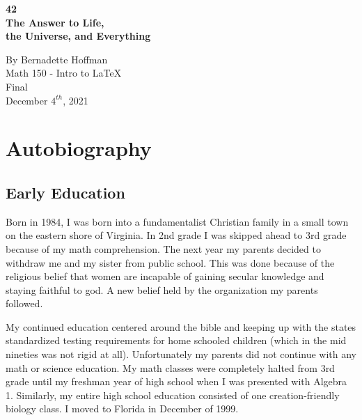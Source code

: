 \documentclass[oneside]{book}
\begin{document}
\frontmatter %
\begin{titlepage}
\begin{center}
\vspace*{3in}
\textbf{\Huge \color{purple}42\\ \huge The Answer to Life, \\the Universe, and Everything}

\bigskip

\LARGE{\color{black}By Bernadette Hoffman}
\bigskip
\bigskip
\large \\Math 150 - Intro to \LaTeX \\ Final \\ December $4^{th}$, 2021
\end{center}
\end{titlepage}

\tableofcontents
\thispagestyle{empty}
\cleardoublepage

\mainmatter %
\setcounter{page}{1}
\chapter{Autobiography}\label{sec:bio}
\section{Early Education}

Born in 1984, I was born into a fundamentalist Christian family in a small town on the eastern shore of Virginia. In 2nd grade I was skipped ahead to 3rd grade because of my math comprehension. The next year my parents decided to withdraw me and my sister from public school. This was done because of the religious belief that women are incapable of gaining secular knowledge and staying faithful to god. A new belief held by the organization my parents followed. 

My continued education centered around the bible and keeping up with the states standardized testing requirements for home schooled children (which in the mid nineties was not rigid at all). Unfortunately my parents did not continue with any math or science education. My math classes were completely halted from 3rd grade until my freshman year of high school when I was presented with Algebra 1. Similarly, my entire high school education consisted of one creation-friendly biology class. I moved to Florida in December of 1999.
\end{document}
